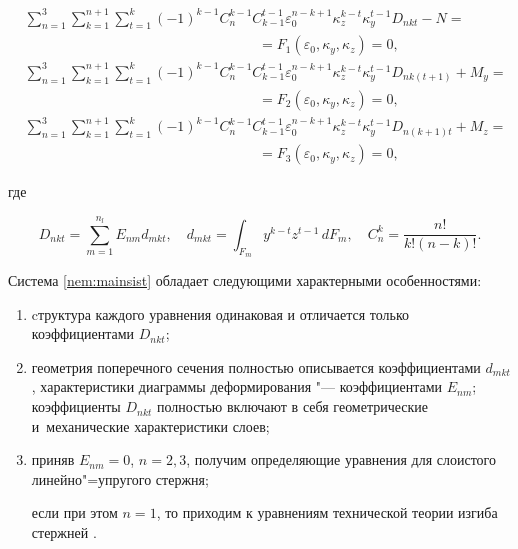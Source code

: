 \begin{equation}\label{nem:mainsist}

\begin{aligned}

&\sum_{n=1}^3 \sum_{k=1}^{n+1}\sum_{t=1}^k (-1)^{k-1}C_n^{k-1}C_{k-1}^{t-1}\varepsilon_0^{n-k+1}\kappa_z^{k-t}\kappa_y^{t-1}D_{nkt}-N = \\

& \hspace{7cm} =F_1 (\varepsilon_0, \kappa_y, \kappa_z )=0,\\

&\sum_{n=1}^3 \sum_{k=1}^{n+1}\sum_{t=1}^k (-1)^{k-1}C_n^{k-1}C_{k-1}^{t-1}\varepsilon_0^{n-k+1}\kappa_z^{k-t}\kappa_y^{t-1} D_{nk(t+1)}+M_y = \\

& \hspace{7cm}  =F_2 (\varepsilon_0, \kappa_y, \kappa_z )=0,\\

&\sum_{n=1}^3{}\sum_{k=1}^{n+1}\sum_{t=1}^k{}(-1)^{k-1}C_n^{k-1}C_{k-1}^{t-1}\varepsilon_0^{n-k+1}\kappa_z^{k-t}\kappa_y^{t-1}D_{n(k+1)t}+M_z = \\

& \hspace{7cm} =F_3(\varepsilon_0, \kappa_y, \kappa_z )=0,

\end{aligned}

\end{equation}

где 

\begin{equation}\label{nem:kof}

D_{nkt}=\sum_{m=1}^{n_{l}}E_{nm}d_{mkt},\quad d_{mkt}=\int_{F_m}^{} y^{k-t}z^{t-1}\,dF_m,\quad C_n^k=\frac{n!}{k!(n-k)!}.

\end{equation}



Система \eqref{nem:mainsist} обладает следующими характерными особенностями:

\begin{enumerate}

\item	cтруктура каждого уравнения одинаковая и отличается только коэффициентами $D_{nkt}$;

\item геометрия поперечного сечения полностью описывается коэффициентами $d_{mkt}$, характеристики диаграммы деформирования "--- коэффициентами $E_{nm}$; коэффициенты $D_{nkt}$ полностью включают в себя геометрические и~механические характеристики слоев;

\item приняв $E_{nm}=0$, $n=2, 3$, получим определяющие уравнения для слоистого линейно"=упругого стержня; 

если при этом $n=1$, то приходим к уравнениям технической теории изгиба стержней \cite{Filin}. 

\end{enumerate}





